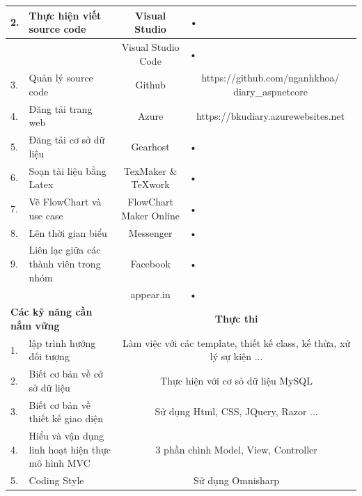 \documentclass[a4paper]{article}
\begin{document}
\begin{table}[h!]
\begin{tabularx}{475pt}{|l|X|c|c|c|c|}
		2. & Thực hiện viết source code & Visual Studio & \multicolumn{3}{l|}{•} \\ \hline

		 && Visual Studio Code & \multicolumn{3}{l|}{•} \\ \hline

		3. & Quản lý source code   & Github & \multicolumn{3}{X|}{https://github.com/nganhkhoa/ diary\_aspnetcore} \\ \hline

		4. & Đăng tải trang web  & Azure & \multicolumn{3}{X|}{https://bkudiary.azurewebsites.net} \\ \hline

		5. & Đăng tải cơ sở dữ liệu  & Gearhost & \multicolumn{3}{l|}{•} \\ \hline

		6. & Soạn tài liệu bằng Latex & TexMaker \& TeXwork  & \multicolumn{3}{l|}{•} \\ \hline

		7. & Vẽ FlowChart và use case & FlowChart Maker Online & \multicolumn{3}{l|}{•} \\ \hline
		
		8. & Lên thời gian biểu & Messenger & \multicolumn{3}{l|}{•} \\ \hline

		9. & Liên lạc giữa các thành viên trong nhóm & Facebook & \multicolumn{3}{l|}{•} \\ \hline

		& & appear.in & \multicolumn{3}{l|}{•} \\ \hline

		\multicolumn{2}{|l|}{\textbf{Các kỹ năng cần nắm vững}} & \multicolumn{4}{c|}{\textbf{Thực thi}} \\ \hline

		1. & lập trình hướng đối tượng & \multicolumn{4}{c|}{Làm việc với các template, thiết kế class, kế thừa, xử lý sự kiện ...} \\ \hline
		2. & Biết cơ bản về cở sở dữ liệu & \multicolumn{4}{c|}{Thực hiện với cơ sỏ dữ liệu MySQL} \\ \hline
		3. & Biết cơ bản về thiết kế giao diện  & \multicolumn{4}{c|}{Sử dụng Html, CSS, JQuery, Razor ...} \\ \hline
		4. & Hiểu và vận dụng linh hoạt hiện thực mô hình MVC & \multicolumn{4}{c|}{3 phần chình Model, View, Controller} \\ \hline
		5. & Coding Style & \multicolumn{4}{c|}{Sử dụng Omnisharp}\\ \hline

		\hline \hline
	\end{tabularx}

\end{table}
\end{document}
